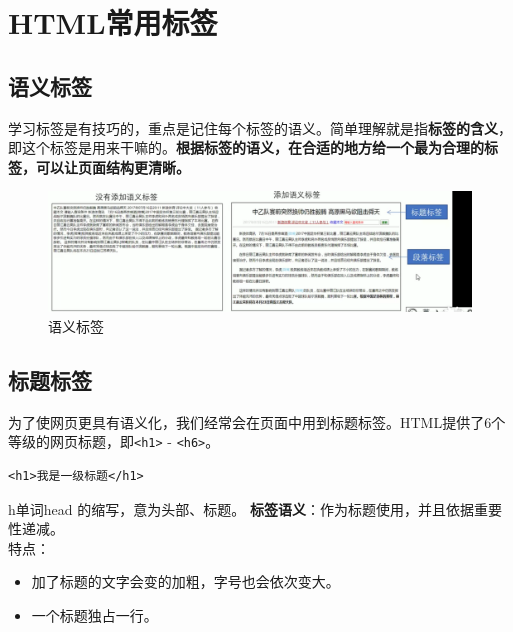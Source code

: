 \documentclass[
]{book}
\providecommand{\tightlist}{%
  \setlength{\itemsep}{0pt}\setlength{\parskip}{0pt}}
\begin{document}
\hypertarget{htmlux5e38ux7528ux6807ux7b7e}{%
\chapter{HTML常用标签}\label{htmlux5e38ux7528ux6807ux7b7e}}

\hypertarget{ux8bedux4e49ux6807ux7b7e}{%
\section{语义标签}\label{ux8bedux4e49ux6807ux7b7e}}

学习标签是有技巧的，重点是记住每个标签的语义。简单理解就是指\textbf{标签的含义}，即这个标签是用来干嘛的。\textbf{根据标签的语义，在合适的地方给一个最为合理的标签，可以让页面结构更清晰。}

\begin{figure}

{\centering \includegraphics{fig/1-6} 

}

\caption{语义标签}\label{fig:unnamed-chunk-1}
\end{figure}

\hypertarget{ux6807ux9898ux6807ux7b7e}{%
\section{标题标签}\label{ux6807ux9898ux6807ux7b7e}}

为了使网页更具有语义化，我们经常会在页面中用到标题标签。HTML提供了6个等级的网页标题，即\texttt{\textless{}h1\textgreater{}} - \texttt{\textless{}h6\textgreater{}}。

\begin{verbatim}
<h1>我是一级标题</h1>
\end{verbatim}

h单词head 的缩写，意为头部、标题。
\textbf{标签语义}：作为标题使用，并且依据重要性递减。\\
特点：

\begin{itemize}
\tightlist
\item
  加了标题的文字会变的加粗，字号也会依次变大。
\item
  一个标题独占一行。
\end{itemize}
\end{document}

